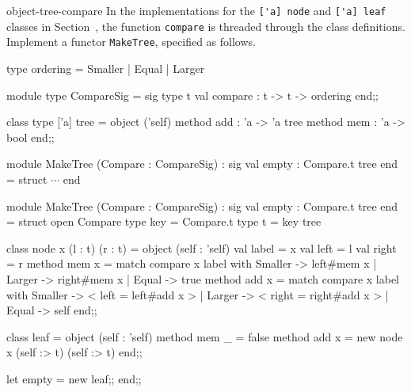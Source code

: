 
\begin{exercise}{object-tree-compare}
In the implementations for the \hbox{\lstinline$['a] node$}
and \hbox{\lstinline$['a] leaf$} classes in
Section~, the
function \hbox{\lstinline$compare$} is threaded through the class
definitions.  Implement a functor \hbox{\lstinline$MakeTree$},
specified as follows.

\begin{ocaml}
type ordering = Smaller | Equal | Larger

module type CompareSig = sig
   type t
   val compare : t -> t -> ordering
end;;

class type ['a] tree =
  object ('self)
    method add : 'a -> 'a tree
    method mem : 'a -> bool
  end;;

module MakeTree (Compare : CompareSig)
  : sig val empty : Compare.t tree end =
struct $\cdots$ end
\end{ocaml}

\begin{answer}\ifanswers
\begin{ocaml}
module MakeTree (Compare : CompareSig)
  : sig val empty : Compare.t tree end =
struct
   open Compare
   type key = Compare.t
   type t = key tree

   class node x (l : t) (r : t) =
     object (self : 'self)
       val label = x
       val left = l
       val right = r
       method mem x =
         match compare x label with
            Smaller -> left#mem x
          | Larger -> right#mem x
          | Equal -> true
       method add x =
         match compare x label with
            Smaller -> {< left = left#add x >}
          | Larger -> {< right = right#add x >}
          | Equal -> self
   end;;

   class leaf =
     object (self : 'self)
       method mem _ = false
       method add x = new node x (self :> t) (self :> t)
     end;;

   let empty = new leaf;;
end;;
\end{ocaml}
\fi\end{answer}
\end{exercise}


